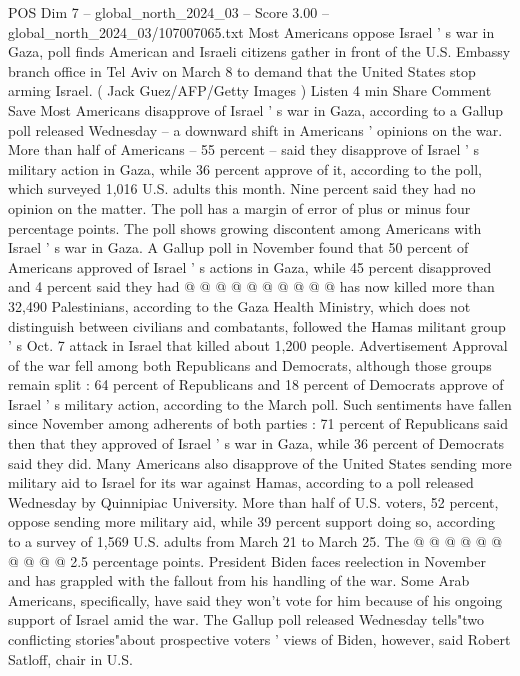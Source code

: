 \begin{textsample}{POS Dim 7 – global\_north\_2024\_03 – Score 3.00 – global\_north\_2024\_03/107007065.txt}  \label{ex:f7_pos_216}
Most Americans oppose Israel ' s war in Gaza, poll finds American and Israeli citizens gather in front of the U.S.
Embassy branch office in Tel Aviv on March 8 to demand that the United States stop arming Israel. ( Jack Guez/AFP/Getty Images ) Listen 4 min Share Comment Save Most Americans disapprove of Israel ' s war in Gaza, according to a Gallup poll released Wednesday -- a downward shift in Americans ' opinions on the war.
More than half of Americans -- 55 percent -- said they disapprove of Israel ' s military action in Gaza, while 36 percent approve of it, according to the poll, which surveyed 1,016 U.S. adults this month.
Nine percent said they had no opinion on the matter.
The poll has a margin of error of plus or minus four percentage points.
The poll shows growing discontent among Americans with Israel ' s war in Gaza.
A Gallup poll in November found that 50 percent of Americans approved of Israel ' s actions in Gaza, while 45 percent disapproved and 4 percent said they had @ @ @ @ @ @ @ @ @ @ has now killed more than 32,490 Palestinians, according to the Gaza Health Ministry, which does not distinguish between civilians and combatants, followed the Hamas militant group ' s Oct. 7 attack in Israel that killed about 1,200 people.
Advertisement Approval of the war fell among both Republicans and Democrats, although those groups remain split : 64 percent of Republicans and 18 percent of Democrats approve of Israel ' s military action, according to the March poll.
Such sentiments have fallen since November among adherents of both parties : 71 percent of Republicans said then that they approved of Israel ' s war in Gaza, while 36 percent of Democrats said they did.
Many Americans also disapprove of the United States sending more military aid to Israel for its war against Hamas, according to a poll released Wednesday by Quinnipiac University.
More than half of U.S. voters, 52 percent, oppose sending more military aid, while 39 percent support doing so, according to a survey of 1,569 U.S. adults from March 21 to March 25.
The @ @ @ @ @ @ @ @ @ @ 2.5 percentage points.
President Biden faces reelection in November and has grappled with the fallout from his handling of the war.
Some Arab Americans, specifically, have said they won't vote for him because of his ongoing support of Israel amid the war.
The Gallup poll released Wednesday tells"two conflicting stories"about prospective voters ' views of Biden, however, said Robert Satloff, chair in U.S.

\end{textsample}
